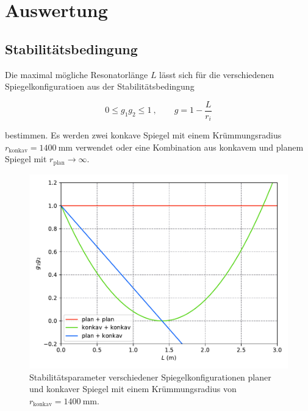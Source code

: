 \vspace{200pt}

\section{Auswertung}
\label{sec:Auswertung}

\subsection{Stabilitätsbedingung}

Die maximal mögliche Resonatorlänge $L$ lässt sich für die verschiedenen
Spiegelkonfiguratioen aus der Stabilitätsbedingung

\vspace{-5pt}
\begin{equation}
    0 \leq g_1 g_2 \leq 1 \:, \qquad g = 1 - \frac{L}{r_i}
\end{equation}

bestimmen. Es werden zwei konkave Spiegel mit einem Krümmungsradius $r_\text{konkav} = \SI{1400}{\milli\meter}$
verwendet oder eine Kombination aus konkavem und planem Spiegel mit $r_\text{plan} \to \infty$.

\begin{figure}[H]
    \centering
    \includegraphics[scale=0.65]{content/g1g2.pdf}
    \vspace{-10pt}
    \caption{Stabilitätsparameter verschiedener Spiegelkonfigurationen planer und konkaver Spiegel mit einem Krümmungsradius
    von $r_\text{konkav} = \SI{1400}{\milli\meter}$.}
    \label{fig:stab}
\end{figure}

